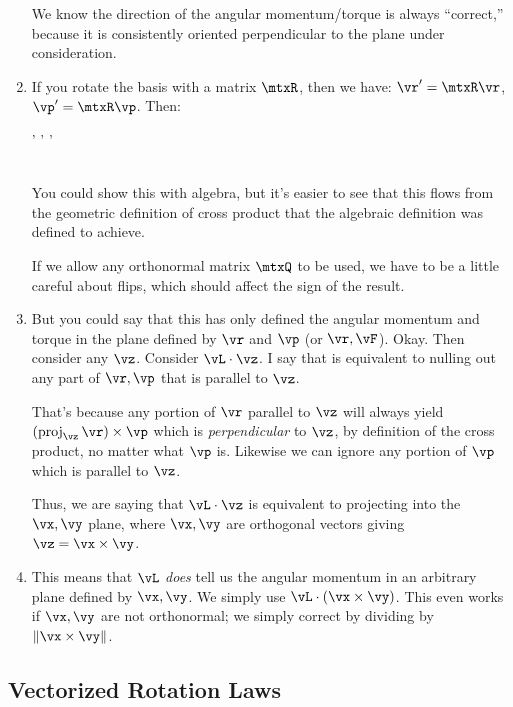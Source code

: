 \begin{enumerate}
  We know the direction of the angular momentum/torque is always
  ``correct,'' because it is consistently oriented perpendicular to the
  plane under consideration.

  \item If you rotate the basis with a matrix $\mtxR$, then we have:
  $\vr' = \mtxR \vr$, $\vp' = \mtxR \vp$. Then:

  \begin{nedqn}
    \vL'
  \eqcol
    \vr' \cross \vp'
  \\
  \eqcol
    \parens{\mtxR\vr} \cross \parens{\mtxR\vp}
  \\
  \eqcol
    \mtxR \parens{\vr \cross \vp}
  \end{nedqn}

  \noindent
  You could show this with algebra, but it's easier to see that this
  flows from the geometric definition of cross product that the
  algebraic definition was defined to achieve.

  If we allow any orthonormal matrix $\mtxQ$ to be used, we have to be a
  little careful about flips, which should affect the sign of the
  result.

  \item But you could say that this has only defined the angular
  momentum and torque in the plane defined by $\vr$ and $\vp$ (or $\vr,
  \vF$). Okay. Then consider any $\vz$. Consider $\vL \cdot \vz$. I say
  that is equivalent to nulling out any part of $\vr, \vp$ that is
  parallel to $\vz$.

  That's because any portion of $\vr$ parallel to $\vz$ will always
  yield $\parens{\proj_{\vz} \vr} \cross \vp$ which is
  \emph{perpendicular} to $\vz$, by definition of the cross product, no
  matter what $\vp$ is. Likewise we can ignore any portion of $\vp$
  which is parallel to $\vz$.

  Thus, we are saying that $\vL \cdot \vz$ is equivalent to projecting
  into the $\vx, \vy$ plane, where $\vx, \vy$ are orthogonal vectors
  giving $\vz = \vx \cross \vy$.

  \item This means that $\vL$ \emph{does} tell us the angular momentum
  in an arbitrary plane defined by $\vx, \vy$. We simply use $\vL \cdot
  \parens{\vx \cross \vy}$. This even works if $\vx, \vy$ are not
  orthonormal; we simply correct by dividing by $\norm{\vx \cross \vy}$.
\end{enumerate}

\subsection{Vectorized Rotation Laws}

